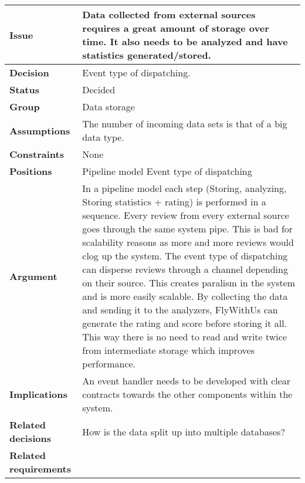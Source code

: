 
\begin{tabular}{ l  p{10cm}}
\hline
\bf Issue & Data collected from external sources requires a great amount of storage over time. It also needs to be analyzed and have statistics generated/stored.\\
\hline
\bf Decision & Event type of dispatching.\\
\hline
\bf Status & Decided\\
\hline
\bf Group & Data storage \\
\hline
\bf Assumptions & The number of incoming data sets is that of a big data type.  \\
\hline
\bf Constraints & None \\
\hline
\bf Positions & Pipeline model \newline\newline
Event type of dispatching
 \\
\hline
\bf Argument & In a pipeline model each step (Storing, analyzing, Storing statistics + rating) is performed in a sequence. Every review from every external source goes through the same system pipe. This is bad for scalability reasons as more and more reviews would clog up the system. The event type of dispatching can disperse reviews through a channel depending on their source. This creates paralism in the system and is more easily scalable. By collecting the data and sending it to the analyzers, FlyWithUs can generate the rating and score before storing it all. This way there is no need to read and write twice from intermediate storage which improves performance. \\
\hline
\bf Implications & An event handler needs to be developed with clear contracts towards the other components within the system.  \\
\hline
\bf Related decisions & How is the data split up into multiple databases? \\
\hline
\bf Related requirements  & \\
\hline
\end{tabular}

